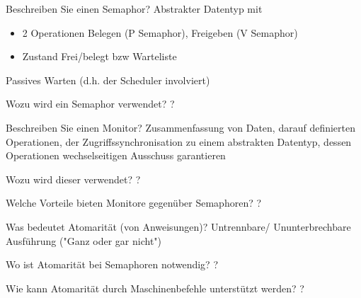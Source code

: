 \documentclass[avery5371]{flashcards}
\begin{document}
\begin{flashcard}[Semaphor]{Beschreiben Sie einen Semaphor?}
    Abstrakter Datentyp mit
    \begin{itemize}
        \item 2 Operationen Belegen (P Semaphor), Freigeben (V Semaphor)
        \item Zustand Frei/belegt bzw Warteliste
    \end{itemize}
    Passives Warten (d.h. der Scheduler involviert)
\end{flashcard}

\begin{flashcard}[Semaphor]{Wozu wird ein Semaphor verwendet?}
    ?
\end{flashcard}

\begin{flashcard}{Beschreiben Sie einen Monitor?}
    Zusammenfassung von Daten, darauf definierten Operationen, der Zugriffssynchronisation zu einem abstrakten Datentyp, dessen Operationen wechselseitigen Ausschuss garantieren
\end{flashcard}

\begin{flashcard}{Wozu wird dieser verwendet?}
    ?
\end{flashcard}

\begin{flashcard}{Welche Vorteile bieten Monitore gegenüber Semaphoren? }
    ?
\end{flashcard}

\begin{flashcard}{Was bedeutet Atomarität (von Anweisungen)?}
    Untrennbare/ Ununterbrechbare Ausführung ("Ganz oder gar nicht")
\end{flashcard}

\begin{flashcard}{Wo ist Atomarität bei Semaphoren notwendig?}
    ?
\end{flashcard}

\begin{flashcard}{Wie kann Atomarität durch Maschinenbefehle unterstützt werden?}
    ?
\end{flashcard}
\end{document}
